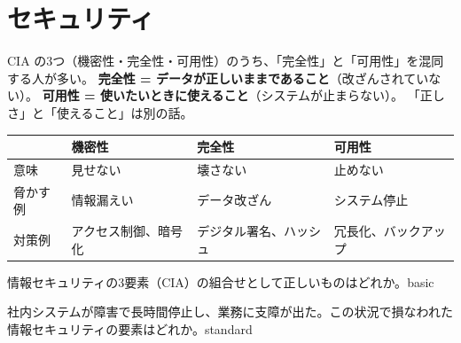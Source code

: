 

\section{セキュリティ}

\mondaipage
{}

\begin{stumble}
CIA の3つ（機密性・完全性・可用性）のうち、「完全性」と「可用性」を混同する人が多い。
\textbf{完全性 = データが正しいままであること}（改ざんされていない）。
\textbf{可用性 = 使いたいときに使えること}（システムが止まらない）。
「正しさ」と「使えること」は別の話。
\end{stumble}

\begin{comparison}
\begin{tabularx}{\textwidth}{lXXX}
  \toprule
  & \textbf{機密性} & \textbf{完全性} & \textbf{可用性} \\
  \midrule
  意味 & 見せない & 壊さない & 止めない \\
  脅かす例 & 情報漏えい & データ改ざん & システム停止 \\
  対策例 & アクセス制御、暗号化 & デジタル署名、ハッシュ & 冗長化、バックアップ \\
  \bottomrule
\end{tabularx}
\end{comparison}


\begin{mondai}{情報セキュリティの3要素（CIA）の組合せとして正しいものはどれか。}{basic}
\end{mondai}

\begin{mondai}{社内システムが障害で長時間停止し、業務に支障が出た。この状況で損なわれた情報セキュリティの要素はどれか。}{standard}
\end{mondai}

